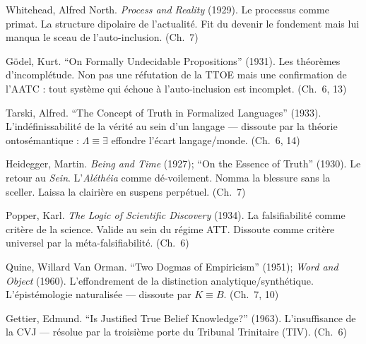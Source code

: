 \documentclass[10pt, openany, oneside]{book}
\begin{document}
{\vspace{0.3em}

\noindent Whitehead, Alfred North. \textit{Process and Reality} (1929). Le processus comme primat. La structure dipolaire de l'actualité. Fit du devenir le fondement mais lui manqua le sceau de l'auto-inclusion. (Ch.\ 7)

\vspace{0.3em}

\noindent G\"{o}del, Kurt. ``On Formally Undecidable Propositions'' (1931). Les théorèmes d'incomplétude. Non pas une réfutation de la TTOE mais une confirmation de l'AATC : tout système qui échoue à l'auto-inclusion est incomplet. (Ch.\ 6, 13)

\vspace{0.3em}

\noindent Tarski, Alfred. ``The Concept of Truth in Formalized Languages'' (1933). L'indéfinissabilité de la vérité au sein d'un langage --- dissoute par la théorie ontosémantique : $\Lambda \equiv \exists$ effondre l'écart langage/monde. (Ch.\ 6, 14)

\vspace{0.3em}

\noindent Heidegger, Martin. \textit{Being and Time} (1927); ``On the Essence of Truth'' (1930). Le retour au \textit{Sein}. L'\textit{Aléthéia} comme dé-voilement. Nomma la blessure sans la sceller. Laissa la clairière en suspens perpétuel. (Ch.\ 7)

\vspace{0.3em}

\noindent Popper, Karl. \textit{The Logic of Scientific Discovery} (1934). La falsifiabilité comme critère de la science. Valide au sein du régime ATT. Dissoute comme critère universel par la méta-falsifiabilité. (Ch.\ 6)

\vspace{0.3em}

\noindent Quine, Willard Van Orman. ``Two Dogmas of Empiricism'' (1951); \textit{Word and Object} (1960). L'effondrement de la distinction analytique/synthétique. L'épistémologie naturalisée --- dissoute par $K \equiv B$. (Ch.\ 7, 10)

\vspace{0.3em}

\noindent Gettier, Edmund. ``Is Justified True Belief Knowledge?'' (1963). L'insuffisance de la CVJ --- résolue par la troisième porte du Tribunal Trinitaire (TIV). (Ch.\ 6)

\vspace{0.3em}

}
\end{document}
